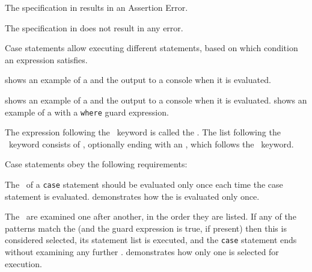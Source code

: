 The specification in 
results in an Assertion Error.

The specification in  does not result in any error.



\hypertarget{def-casestatementterm}{}
Case statements allow executing different statements, based on which
condition an expression satisfies.

 shows an example of a \casestatementterm{}
and the output to a console when it is evaluated.

 shows an example of a \casestatementterm{}
and the output to a console when it is evaluated.
%
 shows an example of a \casestatementterm{}
with a \texttt{where} guard expression.

\hypertarget{def-casediscriminantterm}{}
\hypertarget{def-casealternativeterm}{}
\hypertarget{def-otherwisecaseterm}{}
The expression following the \Tcase\ keyword is called the \emph{\casediscriminantterm}.
The list following the \Tof\ keyword consists of \emph{\casealternativesterm},
optionally ending with an \emph{\otherwisecaseterm}, which follows the \Totherwise\ keyword.

Case statements obey the following requirements:

 The \casediscriminantterm\ of a \texttt{case}
statement should be evaluated only once each time the case statement is evaluated.
%
 demonstrates how the \casediscriminantterm{}
is evaluated only once.

 The \casealternativesterm\ are examined
one after another, in the order they are listed.
If any of the patterns match the \casediscriminantterm{} (and the guard
expression is true, if present) then this \casealternativeterm{} is considered selected,
its statement list is executed, and the \texttt{case} statement ends without examining any further
\casealternativesterm.
%
 demonstrates how only one \casealternativeterm{} is selected
for execution.

